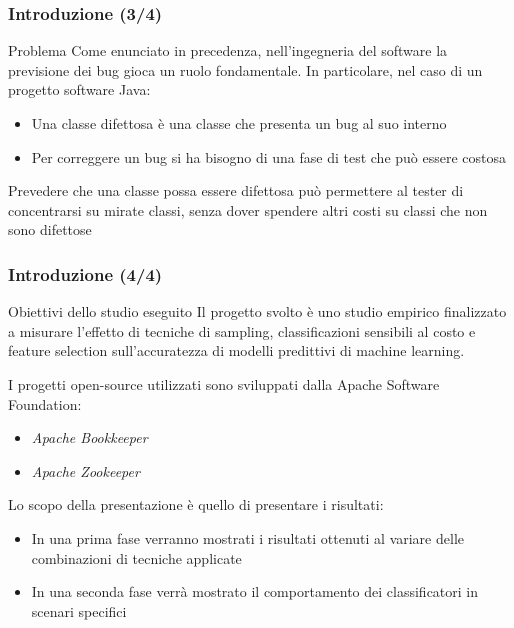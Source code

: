 \documentclass[
	usepdftitle=false,
	xcolor={table, dvipsnames},
	hyperref={
		pdftitle={Machine Learning per Software Engineering},
    	pdfauthor={Alessando Chillotti}
    }
]{beamer}
\begin{document}
\begin{frame}
\frametitle{Introduzione (3/4)}
\begin{block}{Problema}
Come enunciato in precedenza, nell'ingegneria del software la previsione dei bug gioca un ruolo fondamentale. In particolare, nel caso di un progetto software Java:
\begin{itemize}
\item Una classe difettosa è una classe che presenta un bug al suo interno
\item Per correggere un bug si ha bisogno di una fase di test che può essere costosa
\end{itemize}
Prevedere che una classe possa essere difettosa può permettere al tester di concentrarsi su mirate classi, senza dover spendere altri costi su classi che non sono difettose
\end{block}
\end{frame}

\begin{frame}
\frametitle{Introduzione (4/4)}
\begin{block}{Obiettivi dello studio eseguito}
Il progetto svolto è uno studio empirico finalizzato a misurare l’effetto di tecniche di sampling, classificazioni sensibili al costo e feature selection sull’accuratezza di modelli predittivi di machine learning. 

I progetti open-source utilizzati sono sviluppati dalla Apache Software Foundation:
\begin{itemize}
\item \textit{Apache Bookkeeper}
\item \textit{Apache Zookeeper}
\end{itemize}
Lo scopo della presentazione è quello di presentare i risultati:
\begin{itemize}
\item In una prima fase verranno mostrati i risultati ottenuti al variare delle combinazioni di tecniche applicate
\item In una seconda fase verrà mostrato il comportamento dei classificatori in scenari specifici
\end{itemize}
\end{block}
\end{frame}
\end{document}
